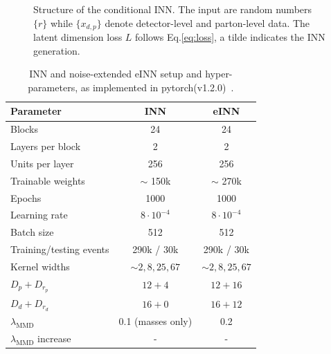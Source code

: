 \begin{figure}[t]
\centering

\caption{Structure of the conditional INN. The input are random
  numbers $\{ r\}$ while $\{ x_{d,p} \}$ denote detector-level and
  parton-level data. The latent dimension loss $L$ follows
  Eq.\eqref{eq:loss}, a tilde indicates the INN generation.}
\label{fig:cinn}
\end{figure}

\begin{table}[b!]
\centering
\begin{small} \begin{tabular}{l|c c}
\toprule
Parameter & INN & eINN  \\
\midrule
Blocks & 24 & 24\\
Layers per block & 2 & 2\\
Units per layer & 256 & 256\\
Trainable weights & $\sim$ 150k & $\sim$ 270k \\
Epochs & 1000 & 1000 \\
Learning rate & $8 \cdot 10 ^{-4}$ & $8 \cdot 10 ^{-4}$\\
Batch size & 512 & 512 \\
Training/testing events & 290k / 30k & 290k / 30k \\
Kernel widths & $\sim 2, 8, 25, 67$ & $\sim 2, 8, 25, 67$\\
$D_p+D_{r_p}$ & $12+4$ & $12+16$ \\
$D_d+D_{r_d}$ & $16+0$ & $16+12$ \\
$\lambda_\text{MMD}$ & 0.1 (masses only) & 0.2 \\
$\lambda_\text{MMD}$ increase & - & - \\
\bottomrule
\end{tabular} \end{small}
\caption{INN and noise-extended eINN setup and hyper-parameters, as
  implemented in pytorch(v1.2.0)~\cite{pytorch}.}
\label{tab:inn}
\end{table}


